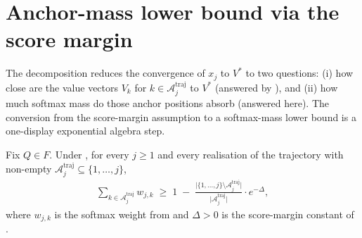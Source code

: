 \section{Anchor-mass lower bound via the score margin}
\label{sec:anchor_mass}

The decomposition  reduces the convergence
of $x_j$ to $V^*$ to two questions: (i) how close are the value vectors
$V_k$ for $k \in \mathcal A^{\mathrm{traj}}_j$ to $V^*$ (answered by
), and (ii) how much softmax mass do
those anchor positions absorb (answered here). The conversion from the
score-margin assumption  to a softmax-mass lower
bound is a one-display exponential algebra step.

\begin{lemma}\label{lem:anchor_mass_lb}
Fix $Q \in F$. Under , for every $j \ge 1$ and
every realisation of the trajectory with non-empty
$\mathcal A^{\mathrm{traj}}_j \subseteq \{1, \dots, j\}$,
\begin{align}\label{eq:anchor_mass_bound}
   \sum_{k \in \mathcal A^{\mathrm{traj}}_j} w_{j,k}
   \;\ge\;
   1 \;-\; \frac{\big|\{1, \dots, j\} \setminus \mathcal A^{\mathrm{traj}}_j\big|}
                {\big|\mathcal A^{\mathrm{traj}}_j\big|} \cdot e^{-\Delta},
\end{align}
where $w_{j,k}$ is the softmax weight from 
and $\Delta > 0$ is the score-margin constant of .
\end{lemma}

